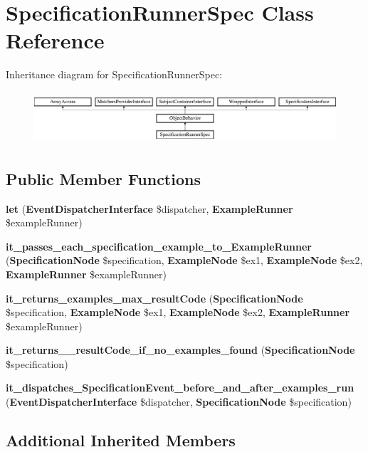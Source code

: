 \section{Specification\+Runner\+Spec Class Reference}
\label{classspec_1_1_php_spec_1_1_runner_1_1_specification_runner_spec}
Inheritance diagram for Specification\+Runner\+Spec\+:\begin{figure}[H]
\begin{center}
\leavevmode
\includegraphics[height=1.953488cm]{classspec_1_1_php_spec_1_1_runner_1_1_specification_runner_spec}
\end{center}
\end{figure}
\subsection*{Public Member Functions}
\begin{DoxyCompactItemize}
\item 
{\bf let} ({\bf Event\+Dispatcher\+Interface} \$dispatcher, {\bf Example\+Runner} \$example\+Runner)
\item 
{\bf it\+\_\+passes\+\_\+each\+\_\+specification\+\_\+example\+\_\+to\+\_\+\+Example\+Runner} ({\bf Specification\+Node} \$specification, {\bf Example\+Node} \$ex1, {\bf Example\+Node} \$ex2, {\bf Example\+Runner} \$example\+Runner)
\item 
{\bf it\+\_\+returns\+\_\+examples\+\_\+max\+\_\+result\+Code} ({\bf Specification\+Node} \$specification, {\bf Example\+Node} \$ex1, {\bf Example\+Node} \$ex2, {\bf Example\+Runner} \$example\+Runner)
\item 
{\bf it\+\_\+returns\+\_\+\_\+result\+Code\+\_\+if\+\_\+no\+\_\+examples\+\_\+found} ({\bf Specification\+Node} \$specification)
\item 
{\bf it\+\_\+dispatches\+\_\+\+Specification\+Event\+\_\+before\+\_\+and\+\_\+after\+\_\+examples\+\_\+run} ({\bf Event\+Dispatcher\+Interface} \$dispatcher, {\bf Specification\+Node} \$specification)
\end{DoxyCompactItemize}
\subsection*{Additional Inherited Members}


